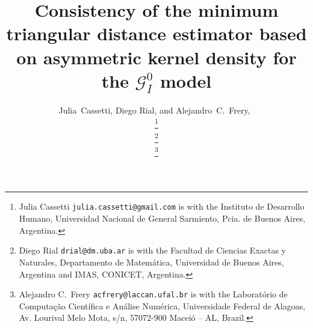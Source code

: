 \documentclass[technote,onecolumn,draftcls,12pt]{IEEEtran}
\numberwithin{equation}{section}
\begin{document}
\title{Consistency of the minimum triangular distance estimator based on asymmetric kernel density for the $\mathcal G_I^0$ model}
\author{ Julia~Cassetti, Diego Rial, and Alejandro~C.~Frery,~


\thanks{Julia Cassetti \texttt{julia.cassetti@gmail.com} is with the  Instituto de Desarrollo Humano, Universidad Nacional de General Sarmiento, Pcia. de Buenos Aires, Argentina.}

\thanks{Diego Rial \texttt{drial@dm.uba.ar} is with the Facultad de Ciencias Exactas y Naturales, Departamento de Matem\'{a}tica, Universidad de Buenos Aires, Argentina and IMAS, CONICET, Argentina.}

\thanks{Alejandro C.\ Frery \texttt{acfrery@laccan.ufal.br} is with the Laborat\'orio de Computa\c c\~ao Cient\'ifica e An\'alise Num\'erica, Universidade Federal de Alagoas, 
Av. Lourival Melo Mota, s/n, 57072-900 Macei\'o -- AL, Brazil.} 
}

\maketitle
\end{document}

